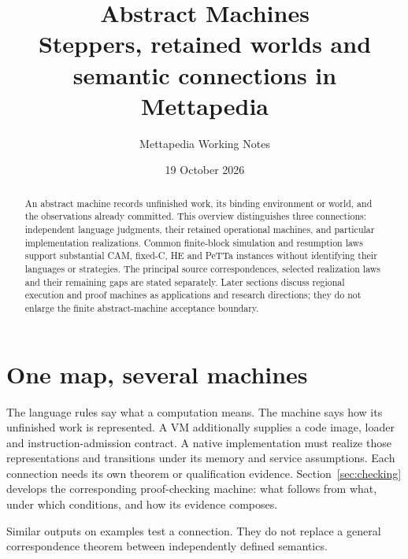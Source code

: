 \documentclass[11pt,a4paper]{article}
\title{\color{ink}Abstract Machines\\[3pt]
  \large Steppers, retained worlds and semantic connections in Mettapedia}
\author{Mettapedia Working Notes}
\date{19 October 2026}
\newcommand{\diagramcaption}[1]{\par{\small\color{ink}#1\par}\medskip}
\begin{document}
\maketitle
\begin{abstract}
An abstract machine records unfinished work, its binding environment or world,
and the observations already committed. This overview distinguishes three
connections: independent language judgments, their retained operational
machines, and particular implementation realizations. Common finite-block
simulation and resumption laws support substantial CAM, fixed-C, HE and PeTTa
instances without identifying their languages or strategies. The principal
source correspondences, selected realization laws and their remaining gaps
are stated separately. Later sections discuss regional execution and proof
machines as applications and research directions; they do not enlarge the
finite abstract-machine acceptance boundary.
\end{abstract}

\section{One map, several machines}

The language rules say what a computation means. The machine says how its
unfinished work is represented. A VM additionally supplies a code image,
loader and instruction-admission contract. A native implementation must
realize those representations and transitions under its memory and service
assumptions. Each connection needs its own theorem or qualification evidence.
Section~\ref{sec:checking} develops the corresponding proof-checking machine:
what follows from what, under which conditions, and how its evidence composes.

\begin{center}
\end{center}
\diagramcaption{Similar outputs on examples test a connection. They do not replace a
general correspondence theorem between independently defined semantics.}
\end{document}
